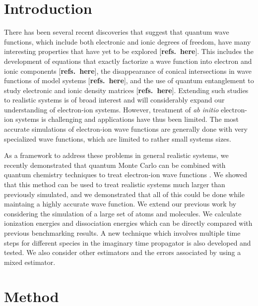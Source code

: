 \documentclass[pra,superscriptaddress,groupedaddress,twocolumn]{revtex4}
\begin{document}
\section{Introduction}
There has been several recent discoveries that suggest that quantum wave functions, which include both electronic and ionic degrees of freedom, have many interesting properties that have yet to be explored [{\bf refs.~here}].  This includes the development of equations that exactly factorize a wave function into electron and ionic components [{\bf refs.~here}], the disappearance of conical intersections in wave functions of model systems [{\bf refs.~here}], and the use of quantum entanglement to study electronic and ionic density matrices [{\bf refs.~here}].  Extending such studies to realistic systems is of broad interest and will considerably expand our understanding of electron-ion systems.   However, treatment of \textit{ab initio} electron-ion systems is challenging and applications have thus been limited.   The most accurate simulations of electron-ion wave functions are generally done with very specialized wave functions, which are limited to rather small systems sizes.  

As a framework to address these problems in general realistic systems, we recently demonstrated that quantum Monte Carlo can be combined with quantum chemistry techniques to treat electron-ion wave functions \cite{Tubman_ECG}.  We showed that this method can be used to treat realistic systems much larger than previously simulated, and we demonstrated that all of this could be done while maintaing a highly accurate wave function.  We extend our previous work by considering the simulation of a large set of atoms and molecules.  We calculate ionization energies and dissociation energies which can be directly compared with previous benchmarking results.  A new technique which involves multiple time steps for different species in the imaginary time propagator is also developed and tested.  We also consider other estimators and the errors associated by using a mixed estimator.

\section{Method}
\end{document}
